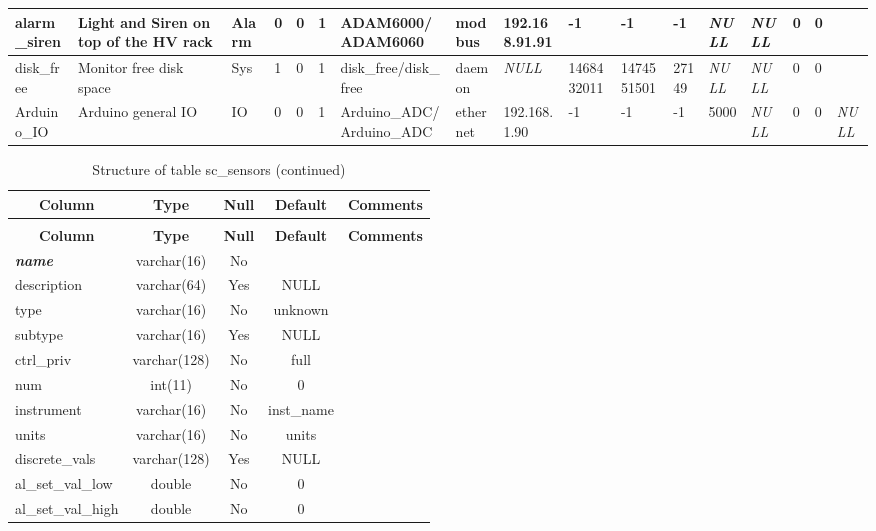 \begin{longtable}{|l|l|l|l|l|l|l|l|l|l|l|l|l|l|l|l|l|}
alarm\_siren & Light and Siren on top of the HV rack & Alarm & 0 & 0 & 1 & ADAM6000/ADAM6060 & modbus & 192.168.91.91 & -1 & -1 & -1 & \textit{NULL} & \textit{NULL} & 0 & 0 &  \\ \hline 
disk\_free & Monitor free disk space & Sys & 1 & 0 & 1 & disk\_free/disk\_free & daemon & \textit{NULL} & 1468432011 & 1474551501 & 27149 & \textit{NULL} & \textit{NULL} & 0 & 0 &  \\ \hline 
Arduino\_IO & Arduino general IO & IO & 0 & 0 & 1 & Arduino\_ADC/Arduino\_ADC & ethernet & 192.168.1.90 & -1 & -1 & -1 & 5000 & \textit{NULL} & 0 & 0 & \textit{NULL} \\ \hline 
 \end{longtable}

%
%
 \begin{longtable}{|l|c|c|c|l|} 
 \caption{Structure of table sc\_sensors} \label{tab:sc_sensors-structure} \\
 \hline \multicolumn{1}{|c|}{\textbf{Column}} & \multicolumn{1}{|c|}{\textbf{Type}} & \multicolumn{1}{|c|}{\textbf{Null}} & \multicolumn{1}{|c|}{\textbf{Default}} & \multicolumn{1}{|c|}{\textbf{Comments}} \\ \hline \hline
\endfirsthead
 \caption{Structure of table sc\_sensors (continued)} \\ 
 \hline \multicolumn{1}{|c|}{\textbf{Column}} & \multicolumn{1}{|c|}{\textbf{Type}} & \multicolumn{1}{|c|}{\textbf{Null}} & \multicolumn{1}{|c|}{\textbf{Default}} & \multicolumn{1}{|c|}{\textbf{Comments}} \\ \hline \hline \endhead \endfoot 
\textbf{\textit{name}} & varchar(16) & No &  \\ \hline 
description & varchar(64) & Yes & NULL \\ \hline 
type & varchar(16) & No & unknown \\ \hline 
subtype & varchar(16) & Yes & NULL \\ \hline 
ctrl\_priv & varchar(128) & No & full \\ \hline 
num & int(11) & No & 0 \\ \hline 
instrument & varchar(16) & No & inst\_name \\ \hline 
units & varchar(16) & No & units \\ \hline 
discrete\_vals & varchar(128) & Yes & NULL \\ \hline 
al\_set\_val\_low & double & No & 0 \\ \hline 
al\_set\_val\_high & double & No & 0 \\ \hline 

\end{longtable}
